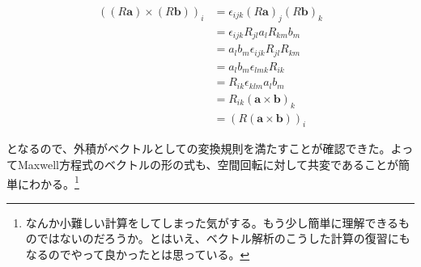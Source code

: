 \documentclass[a4j,12pt,uplatex,dvipdfmx]{jsreport}
\begin{document}
\begin{align*}
  \left( \left( R \bm{a} \right) \times \left( R \bm{b} \right) \right)_i
  &= \epsilon_{ijk} \left( R \bm{a} \right)_j \left( R \bm{b} \right)_k \\
  &= \epsilon_{ijk} R_{jl} a_l R_{km} b_m \\
  &= a_l b_m \epsilon_{ijk} R_{jl} R_{km} \\
  &= a_l b_m \epsilon_{lmk} R_{ik} \\
  &= R_{ik} \epsilon_{klm} a_l b_m \\
  &= R_{ik} \left( \bm{a} \times \bm{b} \right)_k  \\
  &= \left( R \left( \bm{a} \times \bm{b} \right)  \right)_i
\end{align*}

となるので、外積がベクトルとしての変換規則を満たすことが確認できた。よってMaxwell方程式のベクトルの形の式も、空間回転に対して共変であることが簡単にわかる。\footnote{なんか小難しい計算をしてしまった気がする。もう少し簡単に理解できるものではないのだろうか。とはいえ、ベクトル解析のこうした計算の復習にもなるのでやって良かったとは思っている。}
\end{document}
